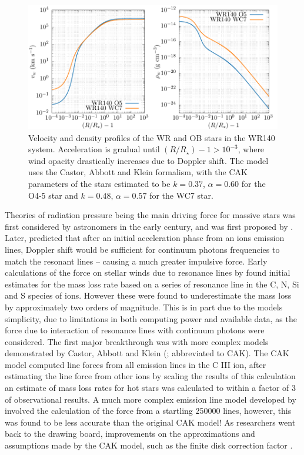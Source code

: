 \begin{figure}[h]
  \centering
  \includegraphics[]{assets/cak/vel.pdf}
  \caption[Radiative line driving velocity and density profile]{Velocity and density profiles of the WR and OB stars in the WR140 system. Acceleration is gradual until $(R/R_\star) - 1 > 10^{-3}$, where wind opacity drastically increases due to Doppler shift. The model uses the Castor, Abbott and Klein formalism, with the CAK parameters of the stars estimated to be $k = 0.37$, $\alpha = 0.60$ for the O4-5 star and $k = 0.48$, $\alpha = 0.57$ for the WC7 star.}
  \label{fig:cak-vel}
\end{figure}

Theories of radiation pressure being the main driving force for massive stars was first considered by astronomers in the early  century, and was first proposed by \textcite{sahaRadiationPressureQuantumTheory1919}.
Later, \textcite{milnePossibilityEmissionHighspeed1926} predicted that after an initial acceleration phase from an ions emission lines, Doppler shift would be sufficient for continuum photons frequencies to match the resonant lines -- causing a much greater impulsive force.
Early calculations of the force on stellar winds due to resonance lines by \textcite{lucy_mass_1970} found initial estimates for the mass loss rate based on a series of resonance line in the C, N, Si and S species of ions.
However these were found to underestimate the mass loss by approximately two orders of magnitude.
This is in part due to the models simplicity, due to limitations in both computing power and available data, as the force due to interaction of resonance lines with continuum photons were considered.
The first major breakthrough was with more complex models demonstrated by Castor, Abbott and Klein (\citeyear{castor_radiation-driven_1975}; abbreviated to CAK).
The CAK model computed line forces from all emission lines in the C III ion, after estimating the line force from other ions by scaling the results of this calculation an estimate of mass loss rates for hot stars was calculated to within a factor of 3 of observational results.
A much more complex emission line model developed by \textcite{1982ApJ...259..282A} involved the calculation of the force from a startling \num{250000} lines, however, this was found to be less accurate than the original CAK model!
As researchers went back to the drawing board, improvements on the approximations and assumptions made by the CAK model, such as the finite disk correction factor
\parencite{friend_theory_1986,pauldrachRadiationdrivenWindsHot1986}.

